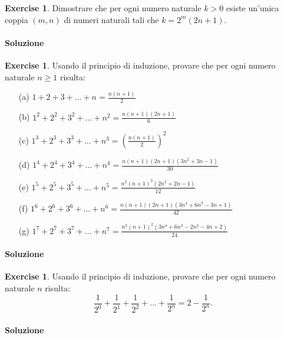 \documentclass{article}
\theoremstyle{plain}
\theoremstyle{definition}
\newtheorem{xca}[exmp]{Exercise}
\theoremstyle{remark}
\begin{document}
\begin{bxthm}
\begin{xca}
Dimostrare che per ogni numero naturale $k > 0$ esiste un'unica 
coppia $(m,n)$ di numeri naturali tali che $k = 2^m(2n+1)$.
\end{xca}
\end{bxthm}
\paragraph{Soluzione}

\begin{bxthm}
\begin{xca}
Usando il principio di induzione, provare che per ogni numero 
naturale $n \ge 1$ risulta:
\begin{itemize}
    \item[(a)] $1 + 2 + 3 + \dots + n = \frac{n(n+1)}{2}$
    \item[(b)] $1^2 + 2^2 + 3^2 + \dots + n^2 = \frac{n(n+1)(2n+1)}{6}$
    \item[(c)] $1^3 + 2^3 + 3^3 + \dots + n^3 = \left(\frac{n(n+1)}{2}\right)^2$
    \item[(d)] $1^4 + 2^4 + 3^4 + \dots + n^4 = \frac{n(n+1)(2n+1)(3n^2+3n-1)}{30}$
    \item[(e)] $1^5 + 2^5 + 3^5 + \dots + n^5 = \frac{n^2(n+1)^2(2n^2+2n-1)}{12}$
    \item[(f)] $1^6 + 2^6 + 3^6 + \dots + n^6 = \frac{n(n+1)(2n+1)(3n^4+6n^3-3n+1)}{42}$
    \item[(g)] $1^7 + 2^7 + 3^7 + \dots + n^7 = \frac{n^2(n+1)^2(3n^4+6n^3-2n^2-4n+2)}{24}$
\end{itemize}
\end{xca}
\end{bxthm}
\paragraph{Soluzione}

\begin{bxthm}
\begin{xca}
Usando il principio di induzione, provare che per ogni numero 
naturale $n$ risulta:
\[
\frac{1}{2^0} + \frac{1}{2^1} + \frac{1}{2^2} + \dots + \frac{1}{2^n} 
= 2 - \frac{1}{2^n}.
\]
\end{xca}
\end{bxthm}
\paragraph{Soluzione}
\end{document}
